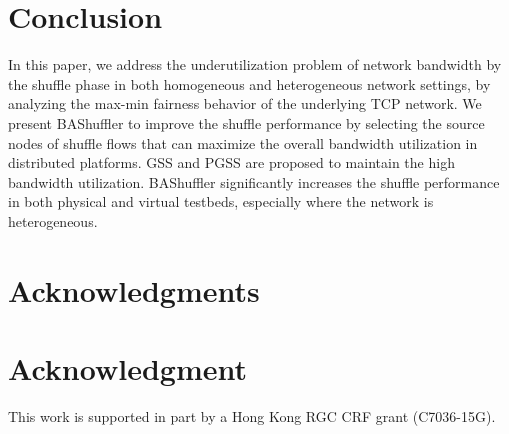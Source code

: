 \documentclass[10pt,journal,compsoc]{IEEEtran}
\begin{document}
\section{Conclusion}\label{section:conclusion}
In this paper, we address the underutilization problem of network
bandwidth by the shuffle phase in both homogeneous and heterogeneous
network settings, by analyzing the max-min fairness behavior of the
underlying TCP network.
We present BAShuffler to improve the shuffle performance by
selecting the source nodes of shuffle flows that can
maximize the overall bandwidth utilization in distributed platforms. 
GSS and PGSS are proposed to maintain the high bandwidth utilization. 
BAShuffler significantly increases the shuffle performance in both
physical and virtual testbeds, especially where the network is
heterogeneous.


\ifCLASSOPTIONcompsoc
 \section*{Acknowledgments}
\else
 \section*{Acknowledgment}
\fi
This work is supported in part by a Hong Kong RGC CRF grant
(C7036-15G).


%
%
\end{document}
